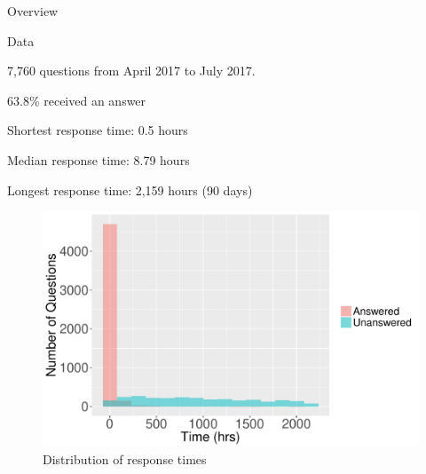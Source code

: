 \documentclass[final]{beamer}
\newlength{\onecolwid}
\begin{document}
\begin{frame}[t]
\begin{columns}[t]
\begin{column}{\onecolwid}
\begin{alertblock}{Overview}
\end{alertblock}


\vspace{1.5ex}

\begin{block}{Data}

\textcolor{dblue!70}{} 7,760 questions from April 2017 to July 2017. 

\vspace{0.5ex}

\textcolor{dblue!70}{} 63.8\% received an answer

\vspace{0.5ex}

\textcolor{dblue!70}{} Shortest response time: 0.5 hours

\vspace{0.5ex}

\textcolor{dblue!70}{} Median response time: 8.79 hours

\vspace{0.5ex}

\textcolor{dblue!70}{} Longest response time: 2,159 hours (90 days)

\end{block}

\begin{figure}
\captionsetup{skip=40pt}
\vspace{4ex}
\includegraphics[width=1\linewidth]{FIG1.pdf}
\caption{Distribution of response times}
\label{fig1}
\end{figure}





\end{column}
\end{columns}
\end{frame}
\end{document}
